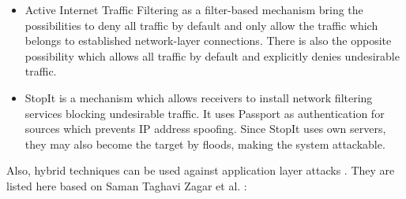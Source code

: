 \begin{itemize}
    \item Active Internet Traffic Filtering as a filter-based mechanism bring the possibilities to deny all traffic by default and only allow the traffic which belongs to established network-layer connections. There is also the opposite possibility which allows all traffic by default and explicitly denies undesirable traffic. 
    \item StopIt is a mechanism which allows receivers to install network filtering services blocking undesirable traffic. It uses Passport as authentication for sources which prevents IP address spoofing. Since StopIt uses own servers, they may also become the target by floods, making the system attackable. 
\end{itemize}

Also, hybrid techniques can be used against application layer attacks \cite{DDoS-MitigationSurvey}. They are listed here based on Saman Taghavi Zagar et al. \cite{DDoS-MitigationSurvey}:
